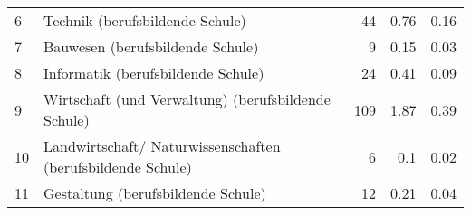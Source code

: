 \begin{longtable}{lXrrr}
     6 &
     \multicolumn{1}{X}{ Technik (berufsbildende Schule)   } &


       \num{44} &
       \num[round-mode=places,round-precision=2]{0,76} &
         \num[round-mode=places,round-precision=2]{0,16} \\

     7 &
     \multicolumn{1}{X}{ Bauwesen (berufsbildende Schule)   } &


       \num{9} &
       \num[round-mode=places,round-precision=2]{0,15} &
         \num[round-mode=places,round-precision=2]{0,03} \\

     8 &
     \multicolumn{1}{X}{ Informatik (berufsbildende Schule)   } &


       \num{24} &
       \num[round-mode=places,round-precision=2]{0,41} &
         \num[round-mode=places,round-precision=2]{0,09} \\

     9 &
     \multicolumn{1}{X}{ Wirtschaft (und Verwaltung) (berufsbildende Schule)   } &


       \num{109} &
       \num[round-mode=places,round-precision=2]{1,87} &
         \num[round-mode=places,round-precision=2]{0,39} \\

     10 &
     \multicolumn{1}{X}{ Landwirtschaft/ Naturwissenschaften (berufsbildende Schule)   } &


       \num{6} &
       \num[round-mode=places,round-precision=2]{0,1} &
         \num[round-mode=places,round-precision=2]{0,02} \\

     11 &
     \multicolumn{1}{X}{ Gestaltung (berufsbildende Schule)   } &


       \num{12} &
       \num[round-mode=places,round-precision=2]{0,21} &
         \num[round-mode=places,round-precision=2]{0,04} \\


\end{longtable}
